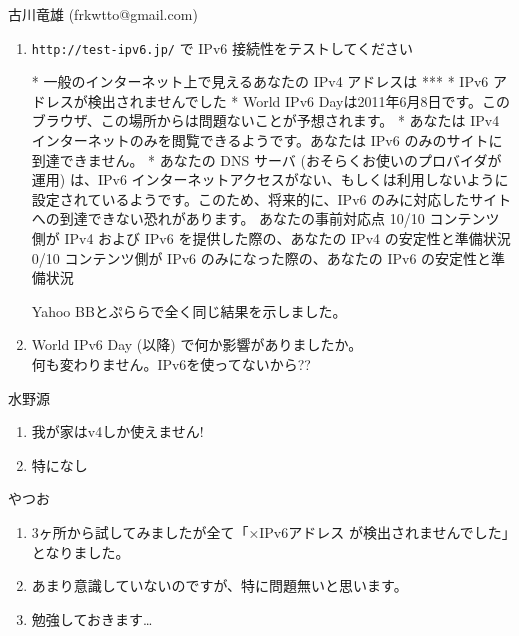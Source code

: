 \documentclass[mingoth,a4paper]{jsarticle}
\begin{document}
\begin{prework}{ 古川竜雄 (frkwtto@gmail.com) }
  \begin{enumerate}
  \item {\tt{http://test-ipv6.jp/}} で IPv6 接続性をテストしてください
\begin{commandline}
* 一般のインターネット上で見えるあなたの IPv4 アドレスは ***
* IPv6 アドレスが検出されませんでした
* World IPv6 Dayは2011年6月8日です。このブラウザ、この場所からは問題ないことが予想されます。
* あなたは IPv4 インターネットのみを閲覧できるようです。あなたは IPv6 のみのサイトに到達できません。
* あなたの DNS サーバ (おそらくお使いのプロバイダが運用) は、IPv6 インターネットアクセスがない、もしくは利用しないように設定されているようです。このため、将来的に、IPv6 のみに対応したサイトへの到達できない恐れがあります。
あなたの事前対応点
10/10  コンテンツ側が IPv4 および IPv6 を提供した際の、あなたの IPv4 の安定性と準備状況
 0/10  コンテンツ側が IPv6 のみになった際の、あなたの IPv6 の安定性と準備状況
\end{commandline}
    Yahoo BBとぷららで全く同じ結果を示しました。
  \item World IPv6 Day (以降) で何か影響がありましたか。\\
    何も変わりません。IPv6を使ってないから??
  \end{enumerate}
\end{prework}

\begin{prework}{ 水野源 }
  \begin{enumerate}
  \item 我が家はv4しか使えません!
  \item 特になし
  \end{enumerate}
\end{prework}

\begin{prework}{ やつお }
  \begin{enumerate}
  \item 3ヶ所から試してみましたが全て「×IPv6アドレス が検出されませんでした」となりました。
  \item あまり意識していないのですが、特に問題無いと思います。
  \item 勉強しておきます…
  \end{enumerate}
\end{prework}
\end{document}
